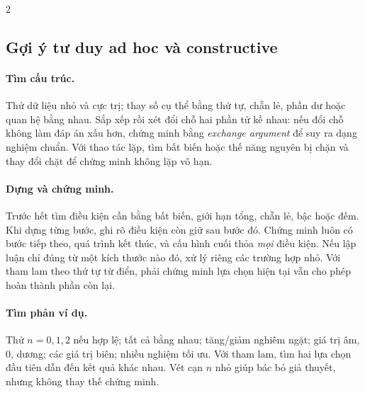 \begin{multicols}{2}
\subsection{Gợi ý tư duy ad hoc và constructive}
\paragraph{Tìm cấu trúc.}
Thử dữ liệu nhỏ và cực trị; thay số cụ thể bằng thứ tự, chẵn lẻ,
phần dư hoặc quan hệ bằng nhau. Sắp xếp rồi xét đổi chỗ hai phần tử
kề nhau: nếu đổi chỗ không làm đáp án xấu hơn, chứng minh bằng
\emph{exchange argument} để suy ra dạng nghiệm chuẩn.
Với thao tác lặp, tìm bất biến hoặc thế năng nguyên bị chặn
và thay đổi chặt để chứng minh không lặp vô hạn.

\paragraph{Dựng và chứng minh.}
Trước hết tìm điều kiện cần bằng bất biến, giới hạn tổng, chẵn lẻ,
bậc hoặc đếm. Khi dựng từng bước, ghi rõ điều kiện còn giữ sau bước đó.
Chứng minh luôn có bước tiếp theo, quá trình kết thúc, và cấu hình cuối
thỏa \emph{mọi} điều kiện. Nếu lập luận chỉ đúng từ một kích thước nào đó,
xử lý riêng các trường hợp nhỏ. Với tham lam theo thứ tự từ điển,
phải chứng minh lựa chọn hiện tại vẫn cho phép hoàn thành phần còn lại.

\paragraph{Tìm phản ví dụ.}
Thử $n=0,1,2$ nếu hợp lệ; tất cả bằng nhau; tăng/giảm nghiêm ngặt;
giá trị âm, $0$, dương; các giá trị biên; nhiều nghiệm tối ưu.
Với tham lam, tìm hai lựa chọn đầu tiên dẫn đến kết quả khác nhau.
Vét cạn $n$ nhỏ giúp bác bỏ giả thuyết, nhưng không thay thế chứng minh.

\end{multicols}
